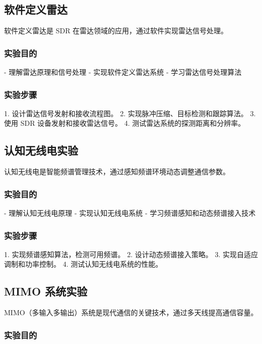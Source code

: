 \documentclass[UTF8]{ctexbook}
\begin{document}
\subsection{软件定义雷达}

软件定义雷达是 SDR 在雷达领域的应用，通过软件实现雷达信号处理。

\subsubsection{实验目的}

- 理解雷达原理和信号处理
- 实现软件定义雷达系统
- 学习雷达信号处理算法

\subsubsection{实验步骤}

1. 设计雷达信号发射和接收流程图。
2. 实现脉冲压缩、目标检测和跟踪算法。
3. 使用 SDR 设备发射和接收雷达信号。
4. 测试雷达系统的探测距离和分辨率。

\subsection{认知无线电实验}

认知无线电是智能频谱管理技术，通过感知频谱环境动态调整通信参数。

\subsubsection{实验目的}

- 理解认知无线电原理
- 实现认知无线电系统
- 学习频谱感知和动态频谱接入技术

\subsubsection{实验步骤}

1. 实现频谱感知算法，检测可用频谱。
2. 设计动态频谱接入策略。
3. 实现自适应调制和功率控制。
4. 测试认知无线电系统的性能。

\subsection{MIMO 系统实验}

MIMO（多输入多输出）系统是现代通信的关键技术，通过多天线提高通信容量。

\subsubsection{实验目的}
\end{document}
